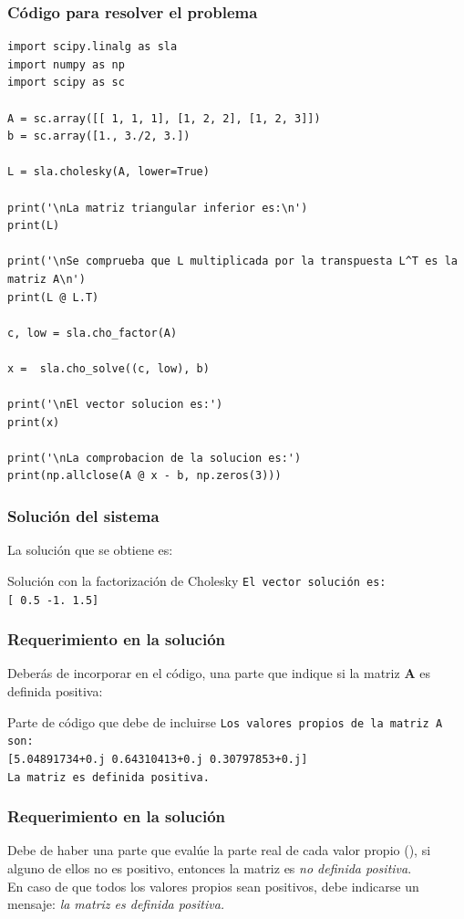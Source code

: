 \begin{frame}
\frametitle{Código para resolver el problema}
\begin{lstlisting}[caption=Código para el ejercicio de factorización Cholesky, basicstyle=\linespread{1.1}\ttfamily=\small, columns=fullflexible]
import scipy.linalg as sla
import numpy as np
import scipy as sc

A = sc.array([[ 1, 1, 1], [1, 2, 2], [1, 2, 3]])
b = sc.array([1., 3./2, 3.])

L = sla.cholesky(A, lower=True)

print('\nLa matriz triangular inferior es:\n')
print(L)

print('\nSe comprueba que L multiplicada por la transpuesta L^T es la matriz A\n')
print(L @ L.T)

c, low = sla.cho_factor(A)

x =  sla.cho_solve((c, low), b)

print('\nEl vector solucion es:')
print(x)

print('\nLa comprobacion de la solucion es:')
print(np.allclose(A @ x - b, np.zeros(3)))
\end{lstlisting}
\end{frame}
\begin{frame}[fragile]
\frametitle{Solución del sistema}
La solución que se obtiene es:
\begin{exampleblock}{Solución con la factorización de Cholesky}
\texttt{El vector solución es:} \\
\texttt{[ 0.5 -1.   1.5]}
   
\end{exampleblock}
\end{frame}
\begin{frame}[fragile]
\frametitle{Requerimiento en la solución}
Deberás de incorporar en el código, una parte que indique si la matriz $\mathbf{A}$ es definida positiva:
\begin{exampleblock}{Parte de código que debe de incluirse}
\fontsize{12}{12}\selectfont
\texttt{Los valores propios de la matriz A son:} \\

\texttt{[5.04891734+0.j 0.64310413+0.j 0.30797853+0.j]} \\

\texttt{La matriz es definida positiva.}
\end{exampleblock}
\end{frame}
\begin{frame}[fragile]
\frametitle{Requerimiento en la solución}
Debe de haber una parte que evalúe la parte real de cada valor propio (), si alguno de ellos no es positivo, entonces la matriz es \emph{no definida positiva}.
\\
\bigskip
En caso de que todos los valores propios sean positivos, debe indicarse un mensaje: \emph{la matriz es definida positiva.}
\end{frame}

